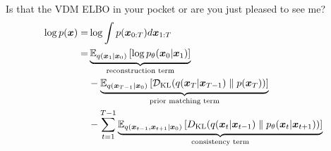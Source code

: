 \begin{frame}{Is that the VDM ELBO in your pocket or are you just pleased to see me?}
    \vspace{-1.4em}
    \begin{align*}
        \log p(\boldsymbol{x}) = & \log\int p(\boldsymbol{x}_{0:T})d \boldsymbol{x}_{1:T}                                                                                                                                                                \\
        =             & \underbrace{\mathbb{E}_{q(\boldsymbol{x}_{1}|\boldsymbol{x}_{0})}\left[\log p_{\theta}(\boldsymbol{x}_{0}|\boldsymbol{x}_{1})\right]}_{\textrm{reconstruction term}}                                                                        \\
                      & - \underbrace{\mathbb{E}_{q(\boldsymbol{x}_{T-1}|\boldsymbol{x}_{0})}\left[{\cal D}_{\mathrm{KL}}(q(\boldsymbol{x}_{T}|\boldsymbol{x}_{T-1}) \parallel p(\boldsymbol{x}_{T}))\right]}_{\textrm{prior matching term}}                                   \\
                      & -\sum_{t=1}^{T-1}\underbrace{\mathbb{E}_{q(\boldsymbol{x}_{t-1},\boldsymbol{x}_{t+1}|\boldsymbol{x}_{0})}\left[D_{\mathrm{KL}}(q(\boldsymbol{x}_{t}|\boldsymbol{x}_{t-1}) \parallel p_{\theta}(\boldsymbol{x}_{t}|\boldsymbol{x}_{t+1}))\right]}_{\textrm{consistency term}} \\
    \end{align*}
\end{frame}